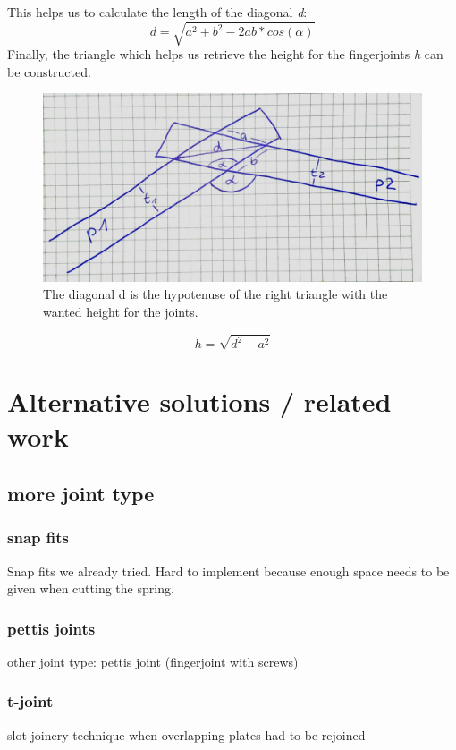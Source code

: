 \documentclass[../ClassicThesis.tex]{subfiles}
\begin{document}
    This helps us to calculate the length of the diagonal \emph{d}:
    $$ d = \sqrt{a^2 + b^2 - 2ab * cos(\alpha)}$$
    Finally, the triangle which helps us retrieve the height for the fingerjoints \emph{h} can be constructed. 
    \begin{figure}[!ht]
    \centering
    \includegraphics[width=0.5\columnwidth]{Images/06-2-joints-newJointHeight3.jpg}
    \caption{The diagonal d is the hypotenuse of the right triangle with the wanted height for the joints.}
    \end{figure}
    
    $$ h = \sqrt{d^2 - a^2} $$
    
    

\section{Alternative solutions / related work}\label{alternativeSolution}
\subsection{more joint type}
\subsubsection{snap fits}
Snap fits we already tried. Hard to implement because enough space needs to be given when cutting the spring.
\subsubsection{pettis joints}
other joint type: pettis joint (fingerjoint with screws)
\subsubsection{t-joint}
slot joinery technique when overlapping plates had to be rejoined
\end{document}

